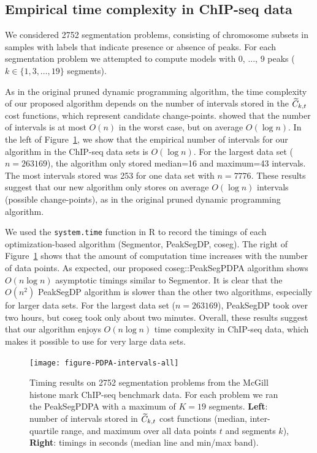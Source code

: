 \documentclass{article}
\begin{document}
\subsection{Empirical time complexity in ChIP-seq data}

We considered 2752 segmentation problems, consisting of chromosome
subsets in samples with labels that indicate presence or absence of
peaks. For each segmentation problem we attempted to compute models
with 0, ..., 9 peaks ($k\in\{1,3,\dots,19\}$ segments).

As in the original pruned dynamic programming algorithm, the time
complexity of our proposed algorithm depends on the number of
intervals stored in the $\widetilde{C}_{k,t}$ cost functions, which represent
candidate change-points. \citet{pruned-dp} showed that the number of
intervals is at most $O(n)$ in the worst case, but on average
$O(\log n)$. In the left of Figure~\ref{fig:timings}, we show that the
empirical number of intervals for our algorithm in the ChIP-seq data
sets is $O(\log n)$. For the largest data set ($n=263169$), the
algorithm only stored median=16 and maximum=43 intervals. The most
intervals stored was 253 for one data set with $n=7776$. These results
suggest that our new algorithm only stores on average $O(\log n)$
intervals (possible change-points), as in the original pruned dynamic
programming algorithm.

We used the \verb|system.time| function in R to record the timings of
each optimization-based algorithm (Segmentor, PeakSegDP, coseg). The
right of Figure~\ref{fig:timings} shows that the amount of computation
time increases with the number of data points. As expected, our
proposed coseg::PeakSegPDPA algorithm shows $O(n\log n)$ asymptotic
timings similar to Segmentor. It is clear that the $O(n^2)$ PeakSegDP
algorithm is slower than the other two algorithms, especially for
larger data sets. For the largest data set ($n=263169$), PeakSegDP
took over two hours, but coseg took only about two minutes. Overall,
these results suggest that our algorithm enjoys $O(n\log n)$ time
complexity in ChIP-seq data, which makes it possible to use for very
large data sets.

\begin{figure}[b!]
  \centering
  \parbox{0.49\textwidth}{
    \texttt{[image: figure-PDPA-intervals-all]}
  }
  \parbox{0.49\textwidth}{
    
  }
  \vskip -0.5cm
  \caption{Timing results on 2752 segmentation problems from the
    McGill histone mark ChIP-seq benchmark data. For each problem we
    ran the PeakSegPDPA with a maximum of $K=19$ segments.
    \textbf{Left}: number of intervals stored in $\widetilde{C}_{k,t}$ cost
    functions (median, inter-quartile range, and maximum over all data
    points $t$ and segments $k$), \textbf{Right}: timings in seconds
    (median line and min/max band).}
  \label{fig:timings}
\end{figure}
\end{document}
